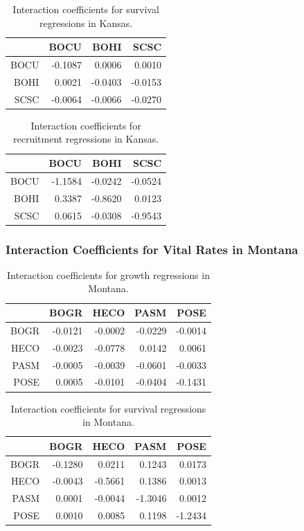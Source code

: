 \documentclass[12pt,]{article}
\begin{document}
\begin{table}[ht]
\centering
\caption{Interaction coefficients for survival regressions in Kansas.} 
\begin{tabular}{rrrr}
  \hline
 & BOCU & BOHI & SCSC \\ 
  \hline
BOCU & -0.1087 & 0.0006 & 0.0010 \\ 
  BOHI & 0.0021 & -0.0403 & -0.0153 \\ 
  SCSC & -0.0064 & -0.0066 & -0.0270 \\ 
   \hline
\end{tabular}
\end{table}

\begin{table}[ht]
\centering
\caption{Interaction coefficients for recruitment regressions in Kansas.} 
\begin{tabular}{rrrr}
  \hline
 & BOCU & BOHI & SCSC \\ 
  \hline
BOCU & -1.1584 & -0.0242 & -0.0524 \\ 
  BOHI & 0.3387 & -0.8620 & 0.0123 \\ 
  SCSC & 0.0615 & -0.0308 & -0.9543 \\ 
   \hline
\end{tabular}
\end{table}



\newpage{}

\subsubsection{Interaction Coefficients for Vital Rates in Montana}

\begin{table}[ht]
\centering
\caption{Interaction coefficients for growth regressions in Montana.} 
\begin{tabular}{rrrrr}
  \hline
 & BOGR & HECO & PASM & POSE \\ 
  \hline
BOGR & -0.0121 & -0.0002 & -0.0229 & -0.0014 \\ 
  HECO & -0.0023 & -0.0778 & 0.0142 & 0.0061 \\ 
  PASM & -0.0005 & -0.0039 & -0.0601 & -0.0033 \\ 
  POSE & 0.0005 & -0.0101 & -0.0404 & -0.1431 \\ 
   \hline
\end{tabular}
\end{table}

\begin{table}[ht]
\centering
\caption{Interaction coefficients for survival regressions in Montana.} 
\begin{tabular}{rrrrr}
  \hline
 & BOGR & HECO & PASM & POSE \\ 
  \hline
BOGR & -0.1280 & 0.0211 & 0.1243 & 0.0173 \\ 
  HECO & -0.0043 & -0.5661 & 0.1386 & 0.0013 \\ 
  PASM & 0.0001 & -0.0044 & -1.3046 & 0.0012 \\ 
  POSE & 0.0010 & 0.0085 & 0.1198 & -1.2434 \\ 
   \hline
\end{tabular}
\end{table}
\end{document}
